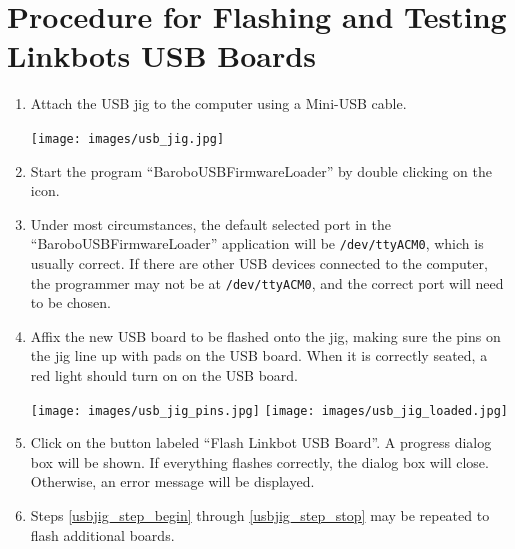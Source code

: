 \documentclass{article}
\begin{document}
\section{\label{sec:flashUSB} Procedure for Flashing and Testing Linkbots USB Boards}

\begin{enumerate}
\item Attach the USB jig to the computer using a Mini-USB cable.

   \begin{center}
   \texttt{[image: images/usb\_jig.jpg]}
   \end{center}

\item Start the program ``BaroboUSBFirmwareLoader'' by double clicking on the icon.

\item Under most circumstances, the default selected port in the
``BaroboUSBFirmwareLoader'' application will be \texttt{/dev/ttyACM0}, which is
usually correct. If there are other USB devices connected to the computer, the programmer
may not be at \texttt{/dev/ttyACM0}, and the correct port will need to be chosen.

\item \label{usbjig_step_begin} Affix the new USB board to be flashed onto the jig, making sure the pins
on the jig line up with pads on the USB board. When it is correctly seated, a
red light should turn on on the USB board.

   \begin{center}
   \texttt{[image: images/usb\_jig\_pins.jpg]}
   \texttt{[image: images/usb\_jig\_loaded.jpg]}
   \end{center}

\item \label{usbjig_step_stop} Click on the button labeled ``Flash Linkbot USB Board''. A progress
dialog box will be shown. If everything flashes correctly, the dialog box will
close. Otherwise, an error message will be displayed.

\item Steps \ref{usbjig_step_begin} through \ref{usbjig_step_stop} may be repeated to flash additional boards.
\end{enumerate}
\end{document}
